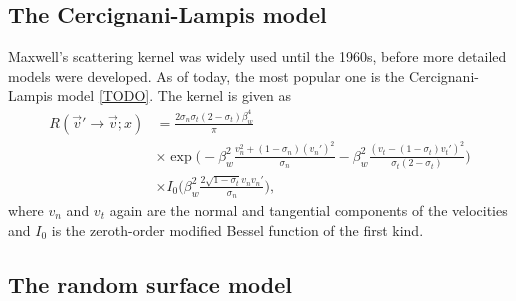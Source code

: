 \subsection{The Cercignani-Lampis model}
Maxwell's scattering kernel was widely used until the 1960s, before more detailed models were developed. As of today, the most popular one is the Cercignani-Lampis model \ref{TODO}. The kernel is given as
\begin{align}
	\nonumber
	R(\vec v'\rightarrow \vec v; x) &= \frac{2\sigma_n\sigma_t(2-\sigma_t)\beta_w^4}{\pi}\\
	\nonumber
	&\times\exp\Big(-\beta_w^2\frac{v_n^2 + (1-\sigma_n)(v_n')^2}{\sigma_n} - \beta_w^2\frac{(v_t - (1 - \sigma_t)v_t')^2}{\sigma_t(2 - \sigma_t)}\Big)\\
	&\times I_0\Big(\beta_w^2\frac{2\sqrt{1 - \sigma_t}v_nv_n'}{\sigma_n}\Big),
\end{align}
where $v_n$ and $v_t$ again are the normal and tangential components of the velocities and $I_0$ is the zeroth-order modified Bessel function of the first kind. 

\subsection{The random surface model}
